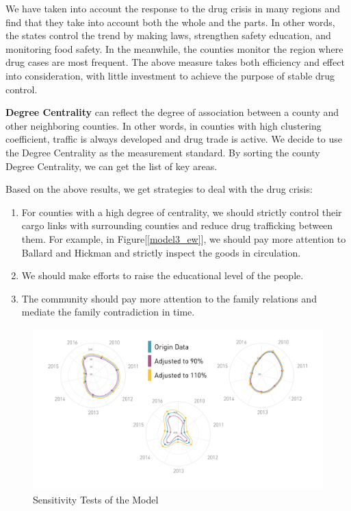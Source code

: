 \documentclass{mcmthesis}
\begin{document}
We have taken into account the response to the drug crisis in many regions\cite{9} and find that they take into account both the whole and the parts. In other words, the states control the trend by making laws, strengthen safety education, and monitoring food safety. In the meanwhile, the counties monitor the region where drug cases are most frequent. The above measure takes both efficiency and effect into consideration, with little investment to achieve the purpose of stable drug control\cite{10}.



\textbf{Degree Centrality} can reflect the degree of association between a county and other neighboring counties. In other words, in counties with high clustering coefficient, traffic is always developed and drug trade is active. We decide to use the Degree Centrality as the measurement standard. By sorting the county Degree Centrality, we can get the list of key areas.

Based on the above results, we get strategies to deal with the drug crisis:

\begin{enumerate}
	\item For counties with a high degree of centrality, we should strictly control their cargo links with surrounding counties and reduce drug trafficking between them. For example, in Figure[\ref{model3_ew}], we should pay more attention to Ballard and Hickman and strictly inspect the goods in circulation.
	\item We should make efforts to raise the educational level of the people.
	\item The community should pay more attention to the family relations and mediate the family contradiction in time.
\end{enumerate}

\begin{figure}[h]
	\centering
	\includegraphics[width=15cm]{figure-release/Model.Sensitivity.png}
	\caption{Sensitivity Tests of the Model}\label{model_sensitivity}
\end{figure}
\end{document}
